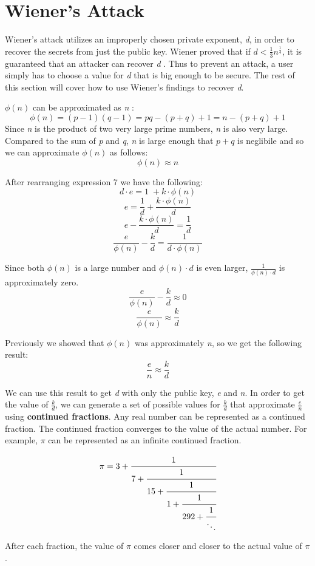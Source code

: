 \documentclass[11pt]{article}
\begin{document}
\section{Wiener's Attack}
Wiener's attack utilizes an improperly chosen private exponent, \emph{d}, in order to recover the secrets from just the public key. Wiener proved that if $d < \frac{1}{3} n^{\frac{1}{4}}$, it is guaranteed that an attacker can recover \emph{d} \cite{boneh}. Thus to prevent an attack, a user simply has to choose a value for \emph{d} that is big enough to be secure. The rest of this section will cover how to use Wiener's findings to recover \emph{d}.

$\phi(n)$ can be approximated as \emph{n} \cite{wieners-youtube}:
$$\phi(n) = (p - 1)(q - 1) = pq - (p + q) + 1 = n - (p + q) + 1$$
Since \emph{n} is the product of two very large prime numbers, \emph{n} is also very large. Compared to the sum of \emph{p} and \emph{q}, \emph{n} is large enough that $p + q $ is neglibile and so we can approximate $\phi(n)$ as follows: 
$$\phi({n}) \approx n$$

After rearranging expression 7 we have the following:
$$ d \cdot e = 1 \; + k \cdot \phi(n) $$
$$ e = \frac{1}{d} + \frac{k \cdot \phi(n)}{d} $$
$$ e - \frac{k \cdot \phi(n)}{d} =  \frac{1}{d} $$
$$ \frac{e}{\phi(n)} - \frac{k}{d} =  \frac{1}{d \cdot \phi(n)} $$

Since both $\phi(n)$ is a large number and $\phi(n) \cdot d$ is even larger, $\frac{1}{\phi(n) \cdot d}$ is approximately zero.
$$ \frac{e}{\phi(n)} - \frac{k}{d} \approx  0 $$
$$ \frac{e}{\phi(n)} \approx \frac{k}{d} $$

Previously we showed that $\phi(n)$ was approximately \emph{n}, so we get the following result:
$$ \frac{e}{n} \approx \frac{k}{d} $$

We can use this result to get \emph{d} with only the public key, \emph{e} and \emph{n}. In order to get the value of $\frac{k}{d}$, we can generate a set of possible values for $\frac{k}{d}$ that approximate $\frac{e}{n}$ using \textbf{continued fractions}. Any real number can be represented as a continued fraction. The continued fraction converges to the value of the actual number. For example, $\pi$ can be represented as an infinite continued fraction. 

$$\pi=3+\cfrac{1}{7+\cfrac{1}{15+\cfrac{1}{1+\cfrac{1}{292+\cfrac{1}{\ddots}}}}}$$

After each fraction, the value of $\pi$ comes closer and closer to the actual value of $\pi$.
\end{document}
